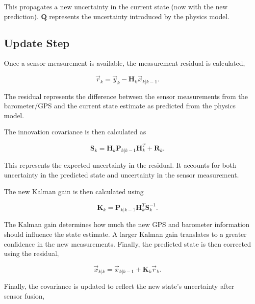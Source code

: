\documentclass{article}
\begin{document}
This propagates a new uncertainty in the current state (now with the new prediction). $\mathbf{Q}$ represents the  uncertainty introduced by the physics model.
\newline 
\subsection{Update Step}
\label{sec:state_update}
Once a sensor measurement is available, the measurement residual is calculated,

\begin{equation}
    \vec{r}_k =
    \vec{y}_k -
    \mathbf{H}_k \vec{x}_{k|k-1}.
    \label{eq:measurement_residual}
\end{equation}

The residual represents the difference between the sensor measurements from the barometer/GPS and the current state estimate as predicted from the physics model.

The innovation covariance is then calculated as

\begin{equation}
    \mathbf{S}_k =
    \mathbf{H}_k \mathbf{P}_{k|k-1} \mathbf{H}_k^T
    + \mathbf{R}_k .
    \label{eq:innovation_covariance}
\end{equation}

This represents the expected uncertainty in the residual. It accounts for both uncertainty in the predicted state and uncertainty in the sensor measurement.

The new Kalman gain is then calculated using

\begin{equation}
    \mathbf{K}_k =
    \mathbf{P}_{k|k-1}
    \mathbf{H}_k^T
    \mathbf{S}_k^{-1}.
    \label{eq:kalman_gain}
\end{equation}

The Kalman gain determines how much the new GPS and barometer information should influence the state estimate. A larger Kalman gain translates to a greater confidence in the new measurements. Finally, the predicted state is then corrected using the residual, 

\begin{equation}
    \vec{x}_{k|k} =
    \vec{x}_{k|k-1}
    + \mathbf{K}_k \vec{r}_k .
    \label{eq:state_update}
\end{equation}

Finally, the covariance is updated to reflect the new state's uncertainty after sensor fusion, 
\end{document}
